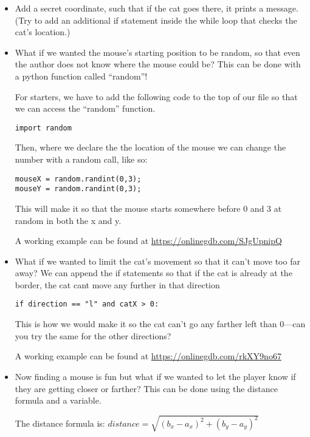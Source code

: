 \documentclass[12pt,oneside]{article}
\newcommand{\q}[1]{``#1''}
\begin{document}
\begin{itemize}

\item Add a secret coordinate, such that if the cat goes there, it prints a message. (Try to add an additional if statement inside the while loop that checks the cat's location.)
\item What if we wanted the mouse's starting position to be random, so that even the author does not know where the mouse could be? This can be done with a python function called \q{random}!

For starters, we have to add the following code to the top of our file so that we can access the \q{random} function.

\begin{lstlisting}
import random
\end{lstlisting}

Then, where we declare the the location of the mouse we can change the number with a random call, like so:


\begin{lstlisting}
mouseX = random.randint(0,3);
mouseY = random.randint(0,3);
\end{lstlisting}

This will make it so that the mouse starts somewhere before 0 and 3 at random in both the x and y. 

A working example can be found at \url{https://onlinegdb.com/SJgUpnipQ}

\item What if we wanted to limit the cat's movement so that it can't move too far away? We can append the if statements so that if the cat is already at the border, the cat cant move any further in that direction

\begin{lstlisting}
if direction == "l" and catX > 0:
\end{lstlisting}

This is how we would make it so the cat can't go any farther left than 0---can you try the same for the other directions?

A working example can be found at \url{https://onlinegdb.com/rkXY9no67}

\item Now finding a mouse is fun but what if we wanted to let the player know if they are getting closer or farther? This can be done using the distance formula and a variable. 

The distance formula is:  $distance = \sqrt{(b_x - a_x)^2 + (b_y - a_y)^2}$


\end{itemize}
\end{document}

